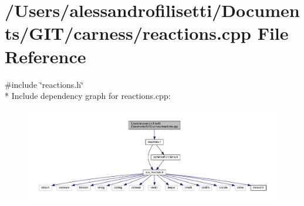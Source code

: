 \hypertarget{a00092}{\section{/\-Users/alessandrofilisetti/\-Documents/\-G\-I\-T/carness/reactions.cpp File Reference}
\label{a00092}
}
{\ttfamily \#include \char`\"{}reactions.\-h\char`\"{}}\\*
Include dependency graph for reactions.\-cpp\-:\nopagebreak
\begin{figure}[H]
\begin{center}
\leavevmode
\includegraphics[width=350pt]{a00141}
\end{center}
\end{figure}
